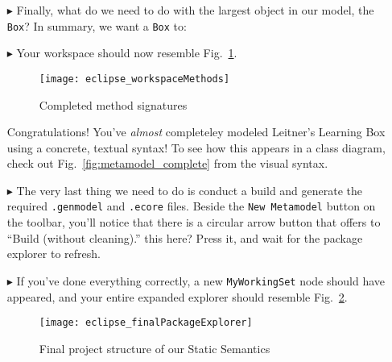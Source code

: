 \begin{itemize}
\item[$\blacktriangleright$] Finally, what do we need to do with the largest object in our model, the \texttt{Box}? In summary, we want a \texttt{Box} to:



\item[$\blacktriangleright$] Your workspace should now resemble Fig.~\ref{fig:workspaceMethods}.
\begin{figure}[htbp]
	\centering
  \texttt{[image: eclipse\_workspaceMethods]}
	\caption{Completed method signatures}
	\label{fig:workspaceMethods}
\end{figure}


Congratulations! You've \emph{almost} completeley modeled Leitner's Learning Box using a concrete, textual syntax! To see how this appears in a class diagram,
check out Fig.~\ref{fig:metamodel_complete} from the visual syntax.

\item[$\blacktriangleright$]The very last thing we need to do is conduct a build and generate the required \texttt{.genmodel} and \texttt{.ecore} files. Beside
the \texttt{New Metamodel} button on the toolbar, you'll notice that there is a circular arrow button that offers to ``Build (without cleaning).''   %
this here? Press it, and wait for the package explorer to refresh.

\item[$\blacktriangleright$] If you've done everything correctly, a new \texttt{MyWorkingSet} node should have appeared, and your entire expanded explorer
should resemble Fig.~\ref{fig:builtModel}.

\begin{figure}[htbp]
	\centering
  \texttt{[image: eclipse\_finalPackageExplorer]}
	\caption{Final project structure of our Static Semantics}
	\label{fig:builtModel}
\end{figure}


\end{itemize}
